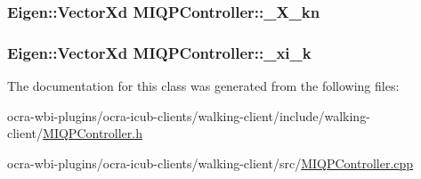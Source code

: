 \hypertarget{classMIQPController_a1fdfcba2c7b6422ac8d3b0b6095d7546}{
\subsubsection[{\-\_\-\-X\-\_\-kn}]{\setlength{\rightskip}{0pt plus 5cm}\-Eigen\-::\-Vector\-Xd {\bf \-M\-I\-Q\-P\-Controller\-::\-\_\-\-X\-\_\-kn}}}\label{classMIQPController_a1fdfcba2c7b6422ac8d3b0b6095d7546}
\hypertarget{classMIQPController_ad1c63725dab2ce84382fcb0b071325ed}{
\subsubsection[{\-\_\-xi\-\_\-k}]{\setlength{\rightskip}{0pt plus 5cm}\-Eigen\-::\-Vector\-Xd {\bf \-M\-I\-Q\-P\-Controller\-::\-\_\-xi\-\_\-k}}}\label{classMIQPController_ad1c63725dab2ce84382fcb0b071325ed}


\-The documentation for this class was generated from the following files\-:\begin{DoxyCompactItemize}
\item 
ocra-\/wbi-\/plugins/ocra-\/icub-\/clients/walking-\/client/include/walking-\/client/\hyperlink{MIQPController_8h}{\-M\-I\-Q\-P\-Controller.\-h}\item 
ocra-\/wbi-\/plugins/ocra-\/icub-\/clients/walking-\/client/src/\hyperlink{MIQPController_8cpp}{\-M\-I\-Q\-P\-Controller.\-cpp}\end{DoxyCompactItemize}
